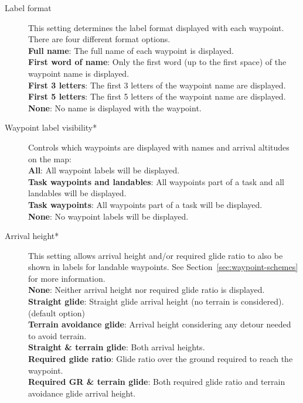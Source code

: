 \begin{description}
\item[Label format]  This setting \label{conf:labels} determines the label format 
  displayed with each waypoint. There are four different format options. \\
  {\bf Full name}: The full name of each waypoint is displayed. \\
  {\bf First word of name}: Only the first word (up to the first space) of the 
  waypoint name is displayed.
 \\
  {\bf First 3 letters}: The first 3 letters of the waypoint name are displayed. \\
  {\bf First 5 letters}: The first 5 letters of the waypoint name are displayed. \\
  {\bf None}: No name is displayed with the waypoint.

\item[Waypoint label visibility*]  \label{conf:labelvisibility} Controls which waypoints
  are displayed with names and arrival altitudes on the map: \\
  {\bf All}: All waypoint labels will be displayed. \\
  {\bf Task waypoints and landables}: All waypoints part of a task and all landables
  will be displayed. \\
  {\bf Task waypoints}: All waypoints part of a task will be displayed. \\
  {\bf None}:  No waypoint labels will be displayed.

\item[Arrival height*] \label{conf:arrivalheight} This setting allows arrival height
and/or required glide ratio to also be shown in labels for landable waypoints. See Section~\ref{sec:waypoint-schemes} for more information.\\
  {\bf None}: Neither arrival height nor required glide ratio is displayed. \\
  {\bf Straight glide}: Straight glide arrival height (no terrain is considered). (default option) \\
  {\bf Terrain avoidance glide}: Arrival height considering any detour needed to avoid terrain. \\
  {\bf Straight \& terrain glide}: Both arrival heights. \\
  {\bf Required glide ratio}: Glide ratio over the ground required to reach the waypoint. \\
  {\bf Required GR \& terrain glide}: Both required glide ratio and terrain avoidance glide arrival height.


\end{description}
